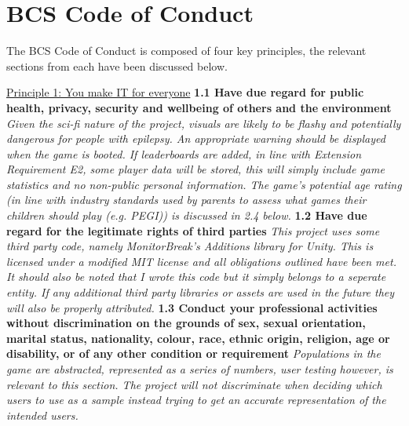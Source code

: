 \documentclass{report}
\begin{document}
\section{BCS Code of Conduct}

The BCS Code of Conduct \cite{bcs} is composed of four key principles, the relevant sections from each have been discussed below.
\newline
\newline
\begin{raggedright}
{\Large \underline{Principle 1: You make IT for everyone}}
\newline
\newline
\textbf{1.1 Have due regard for public health, privacy, security and wellbeing of others and the environment}
\newline
\newline
\textit{Given the sci-fi nature of the project, visuals are likely to be flashy and potentially dangerous for people with epilepsy. An appropriate warning should be displayed when the game is booted. If leaderboards are added, in line with Extension Requirement E2, some player data will be stored, this will simply include game statistics and no non-public personal information. The game's potential age rating (in line with industry standards used by parents to assess what games their children should play (e.g. PEGI)) is discussed in 2.4 below.}
\newline
\newline
\textbf{1.2 Have due regard for the legitimate rights of third parties}
\newline
\newline
\textit{This project uses some third party code, namely MonitorBreak's Additions library for Unity. This is licensed under a modified MIT license\cite{additionsLicense} and all obligations outlined have been met. It should also be noted that I wrote this code but it simply belongs to a seperate entity.
If any additional third party libraries or assets are used in the future they will also be properly attributed.}
\newline
\newline
\textbf{1.3 Conduct your professional activities without discrimination on the grounds of sex, sexual orientation, marital status, nationality, colour, race, ethnic origin, religion, age or disability, or of any other condition or requirement}
\newline
\newline
\textit{Populations in the game are abstracted, represented as a series of numbers, user testing however, is relevant to this section. The project will not discriminate when deciding which users to use as a sample instead trying to get an accurate representation of the intended users.}

\end{raggedright}
\end{document}
